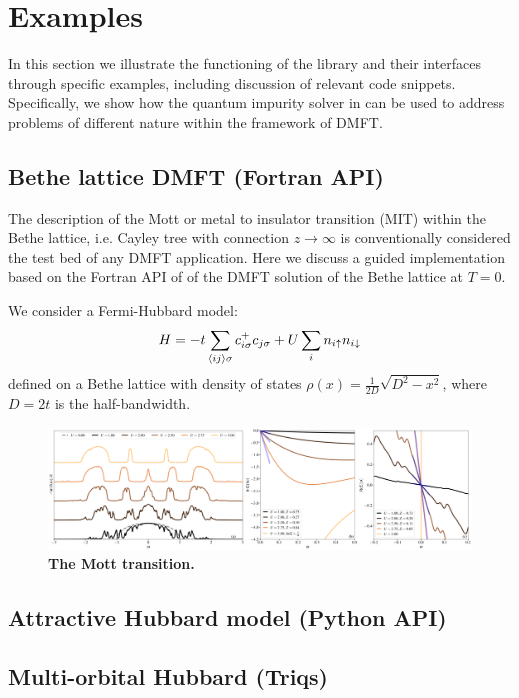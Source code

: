 \section{Examples}\label{SecExamples}
In this section we illustrate the functioning of the \NAME
library and their interfaces through specific examples, including
discussion of relevant code snippets.
Specifically, we show how the quantum impurity solver in \NAME can be used
to address problems of different nature within the framework of DMFT. 


\subsection{Bethe lattice DMFT (Fortran API)}
The description of the Mott or metal to insulator transition (MIT)
within the Bethe lattice, i.e. Cayley tree with connection
$z\to\infty$ is conventionally considered the test bed of any DMFT
application. Here  we discuss a guided implementation based on the
Fortran API of \NAME of the DMFT solution of the Bethe lattice at
$T=0$. 

We consider a Fermi-Hubbard model:
$$
H = -t \sum_{\langle ij\rangle\sigma}c^+_{i\sigma}c_{j\sigma} + U \sum_i n_{i\uparrow}n_{i\downarrow}
$$
defined on a Bethe lattice with density of states
$\rho(x)=\frac{1}{2D}\sqrt{D^2-x^2}$, where $D=2t$ is the
half-bandwidth. 

\begin{figure}[t!]
  \includegraphics[width=\linewidth]{figures/figBethe.pdf}
    \caption{\label{fig1}%
        \textbf{The Mott transition.}
        }
\end{figure}




\subsection{Attractive Hubbard model (Python API)}
\subsection{Multi-orbital Hubbard (Triqs)}


